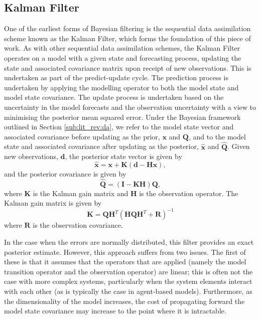 \subsection{Kalman Filter}\label{sub:method:kf}

One of the earliest forms of Bayesian filtering is the sequential data
assimilation scheme known as the Kalman Filter, which forms the foundation of
this piece of work.
As with other sequential data assimilation schemes, the Kalman Filter operates
on a model with a given state and forecasting process, updating the state and
associated covariance matrix upon receipt of new observations.
This is undertaken as part of the predict-update cycle.
The prediction process is undertaken by applying the modelling operator to both
the model state and model state covariance.
The update process is undertaken based on the uncertainty in the model forecasts
and the observation uncertainty with a view to minimising the posterior mean
squared error.
Under the Bayesian framework outlined in Section \ref{sub:lit_rev:da}, we refer
to the model state vector and associated covariance before updating as the prior,
$\mathbf{x}$ and $\mathbf{Q}$, and to the model state and associated covariance
after updating as the posterior, $\hat{\mathbf{x}}$ and $\hat{\mathbf{Q}}$.
Given new observations, $\mathbf{d}$, the posterior state vector is given by
\begin{equation}
    \hat{\mathbf{x}} = \mathbf{x} + \mathbf{K} \left(
                        \mathbf{d} - \mathbf{H} \mathbf{x} \right),
\end{equation}
and the posterior covariance is given by
\begin{equation}
    \hat{\mathbf{Q}} = \left( \mathbf{I} - \mathbf{K} \mathbf{H} \right)
                        \mathbf{Q},
\end{equation}
where $\mathbf{K}$ is the Kalman gain matrix and $\mathbf{H}$ is the observation operator.
The Kalman gain matrix is given by
\begin{equation}
    \mathbf{K} = \mathbf{Q} \mathbf{H}^T \left(
                    \mathbf{H} \mathbf{Q} \mathbf{H}^T + \mathbf{R}
                 \right) ^ {-1}
\end{equation}
where $\mathbf{R}$ is the observation covariance.

In the case when the errors are normally distributed, this filter provides an
exact posterior estimate.
However, this approach suffers from two issues.
The first of these is that it assumes that the operators that are applied
(namely the model transition operator and the observation operator) are linear;
this is often not the case with more complex systems, particularly when the
system elements interact with each other (as is typically the case in
agent-based models).
Furthermore, as the dimensionality of the model increases, the cost of
propagating forward the model state covariance may increase to the point where
it is intractable.

